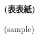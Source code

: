 \begin{titlepage}
\centering
\vspace*{5cm}

{\Huge\bfseries (表表紙)}

\vspace{2cm}

{\Large (sample)}

\vfill

\end{titlepage}